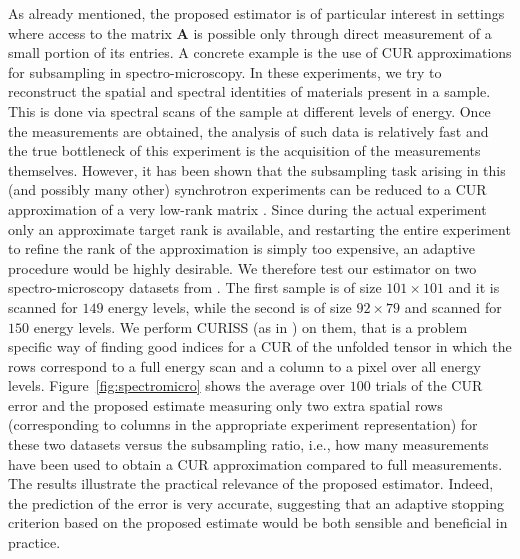 \documentclass[11pt]{article}
\begin{document}
As already mentioned, the proposed estimator is of particular interest in settings where access to the matrix $\mathbf{A}$ is possible only through direct measurement of a small portion of its entries. A concrete example is the use of CUR approximations for subsampling in spectro-microscopy. In these experiments, we try to reconstruct the spatial and spectral identities of materials present in a sample. This is done via spectral scans of the sample at different levels of energy. Once the measurements are obtained, the analysis of such data is relatively fast and the true bottleneck of this experiment is the acquisition of the measurements themselves. However, it has been shown that the subsampling task arising in this (and possibly many other) synchrotron experiments can be reduced to a CUR approximation of a very low-rank matrix \cite{meier2026reducingacquisitiontimeradiation}. Since during the actual experiment only an approximate target rank is available, and restarting the entire experiment to refine the rank of the approximation is simply too expensive, an adaptive procedure would be highly desirable.
We therefore test our estimator on two spectro-microscopy datasets from \cite{meier_2026_18470992}. The first sample is of size $101\times 101$ and it is scanned for $149$ energy levels, while the second is of size $92\times 79$ and scanned for $150$ energy levels. We perform CURISS (as in \cite{meier2026reducingacquisitiontimeradiation}) on them, that is a problem specific way of finding good indices for a CUR of the unfolded tensor in which the rows correspond to a full energy scan and a column to a pixel over all energy levels.
Figure~\ref{fig:spectromicro} shows the average over $100$ trials of the CUR error and the proposed estimate measuring only two extra spatial rows (corresponding to columns in the appropriate  experiment representation) for these two datasets versus the subsampling ratio, i.e., how many measurements have been used to obtain a CUR approximation compared to full measurements. The results illustrate the practical relevance of the proposed estimator.
Indeed, the prediction of the error is very accurate, suggesting that an adaptive stopping criterion based on the proposed estimate would be both sensible and beneficial in practice.
\end{document}
